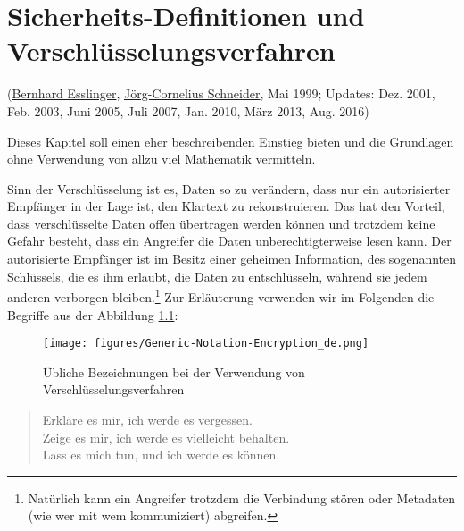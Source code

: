 

\chapter{Sicherheits-Definitionen und Verschlüsselungsverfahren}
\label{Chapter_EncryptionSecDefinitions}

(\hyperlink{author_Bernhard-Esslinger}{Bernhard Esslinger},  \hyperlink{author_Joerg-Cornelius-Schneider}{Jörg-Cornelius Schneider},  Mai 1999; Updates: Dez. 2001, Feb. 2003, Juni 2005, Juli 2007, Jan. 2010, März 2013, Aug. 2016)

Dieses Kapitel soll einen eher beschreibenden Einstieg bieten und die Grundlagen ohne Verwendung von allzu viel Mathematik vermitteln.

Sinn der Verschlüsselung  ist es, Daten so zu verändern, dass nur ein autorisierter Empfän\-ger in der Lage ist, den Klartext zu rekonstruieren. 
Das hat den Vorteil, dass verschlüsselte Daten offen übertragen werden können und trotzdem keine Gefahr besteht,
dass ein Angreifer die Daten unberechtigterweise lesen kann. 
Der autorisierte Empfänger ist im Besitz einer geheimen Information, des sogenannten Schlüssels, die es ihm erlaubt, die Daten zu entschlüsseln, während sie jedem anderen verborgen bleiben.\footnote{%
  Natürlich kann ein Angreifer trotzdem die Verbindung stören oder
  Metadaten (wie wer mit wem kommuniziert) abgreifen.
}
Zur Erläuterung verwenden wir im Folgenden die Begriffe aus der
Abbildung \ref{cm_Generic-Notations-when-Encrypting}:
\begin{figure}[ht]
\begin{center}
\texttt{[image: figures/Generic-Notation-Encryption\_de.png]}
\caption{Übliche Bezeichnungen bei der Verwendung von Verschlüsselungsverfahren} 
\label{cm_Generic-Notations-when-Encrypting}
\end{center}
\end{figure}



\newpage

\begin{quote}
Erkläre es mir, ich werde es vergessen.\\
Zeige es mir, ich werde es vielleicht behalten.\\
Lass es mich tun, und ich werde es können.
\end{quote}


